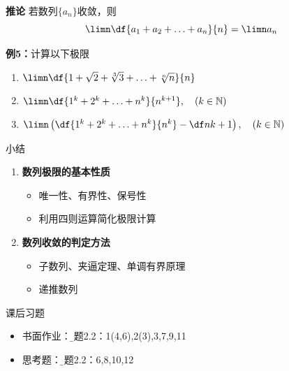 \begin{frame}
	\linespread{1.2}
	\begin{block}{\bf 推论}
		若数列$\{a_n\}$收敛，则
		$$\limn\df{a_1+a_2+\ldots+a_n}{n}=\limn a_n$$
	\end{block}
	\pause
	\begin{exampleblock}{{\bf 例5：}计算以下极限}
		\begin{enumerate}
		  \item $\limn\df{1+\sqrt 2+\sqrt[3]{3}+\ldots+\sqrt[n]{n}}{n}$\pause 
		  \item $\limn\df{1^k+2^k+\ldots+n^k}{n^{k+1}},\quad(k\in\mathbb{N})$\pause 
		  \item $\limn\left(\df{1^k+2^k+\ldots+n^k}{n^{k}}-\df
		  n{k+1}\right),\quad(k\in\mathbb{N})$
		\end{enumerate}
	\end{exampleblock}
\end{frame}

\begin{frame}[<+->]{小结}
	\linespread{1.5}
	\begin{enumerate}
	  \item {\bf 数列极限的基本性质}
	  \begin{itemize}
	    \item 唯一性、有界性、保号性
	    \item 利用四则运算简化极限计算
	  \end{itemize}
	  \item {\bf 数列收敛的判定方法}
	  \begin{itemize}
	    \item 子数列、夹逼定理、单调有界原理
	    \item 递推数列
	  \end{itemize}
	\end{enumerate}
	\pause
	\pause
	\begin{exampleblock}{课后习题}
	  \begin{itemize}
	    \item 书面作业：{\b 习题2.2：1(4,6),2(3),3,7,9,11}
	    \item 思考题：{\b 习题2.2：6,8,10,12}
	  \end{itemize}
	\end{exampleblock}
\end{frame}



